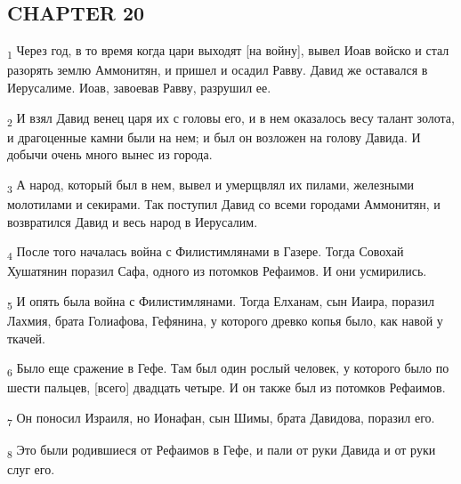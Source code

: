 \subsection{CHAPTER 20}
\begin{tcolorbox}
\textsubscript{1} Через год, в то время когда цари выходят [на войну], вывел Иоав войско и стал разорять землю Аммонитян, и пришел и осадил Равву. Давид же оставался в Иерусалиме. Иоав, завоевав Равву, разрушил ее.
\end{tcolorbox}
\begin{tcolorbox}
\textsubscript{2} И взял Давид венец царя их с головы его, и в нем оказалось весу талант золота, и драгоценные камни были на нем; и был он возложен на голову Давида. И добычи очень много вынес из города.
\end{tcolorbox}
\begin{tcolorbox}
\textsubscript{3} А народ, который был в нем, вывел и умерщвлял их пилами, железными молотилами и секирами. Так поступил Давид со всеми городами Аммонитян, и возвратился Давид и весь народ в Иерусалим.
\end{tcolorbox}
\begin{tcolorbox}
\textsubscript{4} После того началась война с Филистимлянами в Газере. Тогда Совохай Хушатянин поразил Сафа, одного из потомков Рефаимов. И они усмирились.
\end{tcolorbox}
\begin{tcolorbox}
\textsubscript{5} И опять была война с Филистимлянами. Тогда Елханам, сын Иаира, поразил Лахмия, брата Голиафова, Гефянина, у которого древко копья было, как навой у ткачей.
\end{tcolorbox}
\begin{tcolorbox}
\textsubscript{6} Было еще сражение в Гефе. Там был один рослый человек, у которого было по шести пальцев, [всего] двадцать четыре. И он также был из потомков Рефаимов.
\end{tcolorbox}
\begin{tcolorbox}
\textsubscript{7} Он поносил Израиля, но Ионафан, сын Шимы, брата Давидова, поразил его.
\end{tcolorbox}
\begin{tcolorbox}
\textsubscript{8} Это были родившиеся от Рефаимов в Гефе, и пали от руки Давида и от руки слуг его.
\end{tcolorbox}
